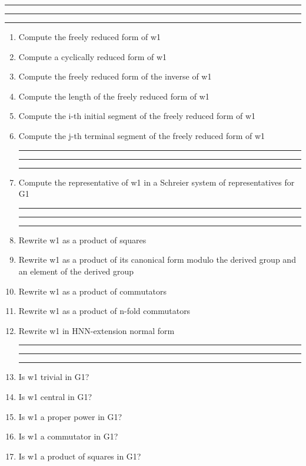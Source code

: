 
\bigskip
\hrule\hrule\hrule

\begin{enumerate}

\item Compute the freely reduced form of w1

\item Compute a cyclically reduced form of w1

\item Compute the freely reduced form of the inverse of w1

\item Compute the length of the freely reduced form of w1

\item Compute the i-th initial segment of the freely reduced form of w1

\item Compute the j-th terminal segment of the freely reduced form of w1

\bigskip
\hrule\hrule\hrule

\item Compute the representative of w1 in a Schreier system of representatives for
G1


\bigskip
\hrule\hrule\hrule

\item Rewrite w1 as a product of squares

\item Rewrite w1 as a product of its canonical form modulo the derived group
and an element of the derived group

\item Rewrite w1 as a product of commutators

\item Rewrite w1 as a product of n-fold commutators

\item Rewrite w1 in HNN-extension normal form
\bigskip
\hrule\hrule\hrule

\item Is w1 trivial in G1?

\item Is w1 central in G1?

\item Is w1 a proper power in G1?

\item Is w1 a commutator in G1?

\item Is w1 a product of squares in G1?


\end{enumerate}

